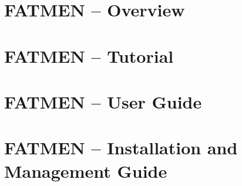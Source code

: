 
 
\setlongtables
\makeindex
\psdraft
\PScommands%
\setcounter{secnumdepth}{1}
\setcounter{tocdepth}{2}


\setcounter{page}{1}
\part{FATMEN -- Overview}

\part{FATMEN -- Tutorial}

\part{FATMEN -- User Guide}

\part{FATMEN -- Installation and Management Guide}

\begin{appendix}

\end{appendix}



